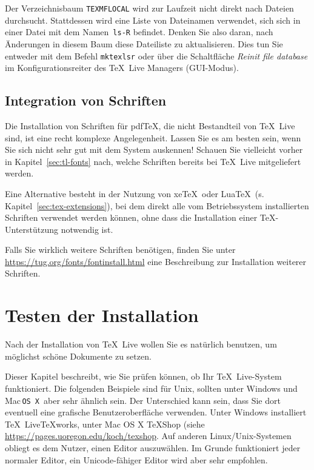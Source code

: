 \documentclass[12pt,ngerman,a4paper,fullparskip]{scrreprt}
\newcommand{\TL}{\TeX\ Live\xspace}
\newcommand{\acro}[1]{\texttt{#1}}
\newcommand{\cmdname}[1]{\texttt{#1}}
\newcommand{\filename}[1]{\texttt{#1}}
\newcommand{\dirname}[1]{\texttt{#1}}
\providecommand*{\MacOSX}{Mac\,\acro{OS\,X}\xspace}
\providecommand*{\XeTeX}{xe\TeX\xspace}
\begin{document}
Der Verzeichnisbaum \dirname{TEXMFLOCAL} wird zur Laufzeit nicht direkt nach Dateien durchsucht. Stattdessen wird eine Liste von Dateinamen verwendet, sich sich in einer Datei mit dem Namen~\filename{ls-R} befindet. Denken Sie also daran, nach Änderungen in diesem Baum diese Dateiliste zu aktualisieren. Dies tun Sie
entweder mit dem Befehl \cmdname{mktexlsr} oder über die Schaltfläche \emph{Reinit file database} im Kon\-fi\-gu\-rations\-reiter des \TeX\ Live Managers (GUI-Modus).

\subsection{Integration von Schriften}

Die Installation von Schriften für pdf\TeX, die nicht Bestandteil von \TL sind, ist eine recht komplexe Angelegenheit. Lassen Sie es am besten sein, wenn Sie sich nicht sehr gut mit dem System auskennen! Schauen Sie vielleicht vorher in Kapitel~\ref{sec:tl-fonts} nach, welche Schriften bereits bei \TL mitgeliefert werden.

Eine Alternative besteht in der Nutzung von \XeTeX\ oder Lua\TeX\ (s.\,Kapitel~\ref{sec:tex-extensions}), bei dem direkt alle vom Betriebssystem installierten Schriften verwendet werden können, ohne dass die Installation einer \TeX-Unterstützung notwendig ist.

Falls Sie wirklich weitere Schriften benötigen, finden Sie unter \url{https://tug.org/fonts/fontinstall.html} eine Beschreibung zur
Installation weiterer Schriften.

\section{Testen der Installation}
\label{sec:test-install}


Nach der Installation von \TL wollen Sie es natürlich benutzen, um möglichst schöne Dokumente zu setzen.

Dieser Kapitel beschreibt, wie Sie prüfen können, ob Ihr \TL-System funktioniert.
Die folgenden Beispiele sind für Unix, sollten unter Windows und \MacOSX\ aber sehr ähnlich sein. Der Unterschied kann sein, dass Sie dort eventuell eine grafische Benutzeroberfläche verwenden. 
Unter Windows installiert \TL \TeX works, unter Mac OS X \TeX Shop (siehe \url{https://pages.uoregon.edu/koch/texshop}.  Auf anderen Linux/Unix-Systemen obliegt es dem Nutzer, einen Editor auszuwählen. 
Im Grunde funktioniert jeder normaler Editor, ein Unicode-fähiger Editor wird aber sehr empfohlen.
\end{document}
